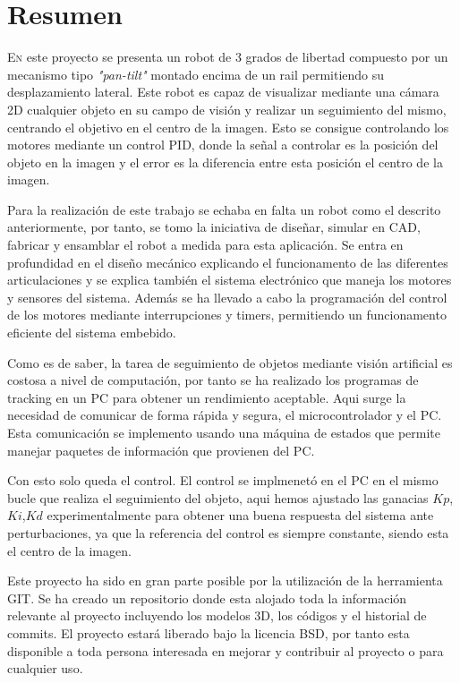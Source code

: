 \chapter*{Resumen}
\pagestyle{especial}
{}

\lettrine[lraise=-0.1, lines=2, loversize=0.2]{E}{n} este proyecto se presenta un robot de 3 grados de libertad compuesto por 
un mecanismo tipo \textit{"pan-tilt"} montado encima de un rail permitiendo su desplazamiento lateral. Este robot es capaz 
de visualizar mediante una cámara 2D cualquier objeto en su campo de visión y realizar un seguimiento del mismo, centrando  
el objetivo en el centro de la imagen. Esto se consigue controlando los motores mediante un control PID, donde la señal 
a controlar es la posición del objeto en la imagen y el error es la diferencia entre esta posición el centro de la imagen.

Para la realización de este trabajo se echaba en falta un robot como el descrito anteriormente, por tanto, se tomo la iniciativa 
de diseñar, simular en CAD, fabricar y ensamblar el robot a medida para esta aplicación. Se entra en profundidad en el diseño mecánico 
explicando el funcionamento de las diferentes articulaciones y se explica también el sistema electrónico que maneja los motores y 
sensores del sistema. Además se ha llevado a cabo la programación del control de los motores mediante interrupciones y timers, permitiendo 
un funcionamento eficiente del sistema embebido. 

Como es de saber, la tarea de seguimiento de objetos mediante visión artificial es costosa a nivel de computación, por tanto se ha 
realizado los programas de tracking en un PC para obtener un rendimiento aceptable. Aqui surge la necesidad de comunicar de forma rápida 
y segura, el microcontrolador y el PC. Esta comunicación se implemento usando una máquina de estados que permite manejar paquetes de 
información que provienen del PC. 

Con esto solo queda el control. El control se implmenetó en el PC en el mismo bucle que realiza el seguimiento del objeto, aqui hemos ajustado 
las ganacias $Kp$,$Ki$,$Kd$ experimentalmente para obtener una buena respuesta del sistema ante perturbaciones, ya que la referencia del control 
es siempre constante, siendo esta el centro de la imagen.

Este proyecto ha sido en gran parte posible por la utilización de la herramienta GIT. Se ha creado un repositorio donde esta alojado toda la información
relevante al proyecto incluyendo los modelos 3D, los códigos y el historial de commits. El proyecto estará liberado bajo la licencia BSD, por tanto esta 
disponible a toda persona interesada en mejorar y contribuir al proyecto o para cualquier uso.


